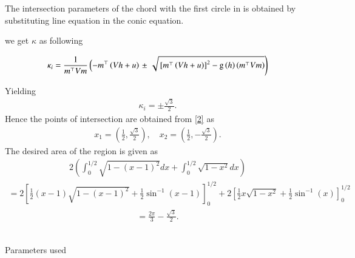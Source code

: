 \documentclass[journal]{IEEEtran}
\begin{document}
 The intersection parameters of the chord with the first circle in is obtained by substituting line equation in the conic equation.

we get $\kappa$ as following 

    \begin{multline}
\kappa_i = \frac{1}
{
m^{\top}Vm
}
\left(-m^{\top}\left(Vh+u\right)\right.
\pm
\left.\sqrt{
{}\left[
m^{\top}\left(Vh+u\right)
\right]^2
	-\text{g}
\left(h
\right)
\left(m^{\top}Vm\right)
}
\right)
\label{13}
\end{multline}

Yielding
 \begin{align}
\kappa_i = \pm \frac{\sqrt{3}}{2}. \label{14}
 \end{align}
Hence the points of intersection are obtained from \eqref{2} as
 \begin{align}
x_1 = \left( \frac{1}{2}, \frac{\sqrt{3}}{2} \right), \quad x_2 = \left( \frac{1}{2}, -\frac{\sqrt{3}}{2} \right). \label{15}
 \end{align}
The desired area of the region is given as
 \begin{align}
2 \left( \int_0^{1/2} \sqrt{1 - (x - 1)^2} dx + \int_0^{1/2} \sqrt{1 - x^2} dx \right) \label{16}
 \end{align}
 \begin{align}
= 2 \left[ \frac{1}{2} \left( x - 1 \right) \sqrt{1 - (x - 1)^2} + \frac{1}{2} \sin^{-1}(x - 1) \right]_0^{1/2} + 2 \left[ \frac{1}{2} x \sqrt{1 - x^2} + \frac{1}{2} \sin^{-1}(x) \right]_0^{1/2} \label{17}
 \end{align}
 \begin{align}
= \frac{2\pi}{3} - \frac{\sqrt{3}}{2}. \label{18}
 \end{align}
 \\
 
 \begin{table}[h!]
    \centering
    
    \caption{Parameters used}
    \label{tab:9.5-5}
\end{table}
\\
\end{document}
